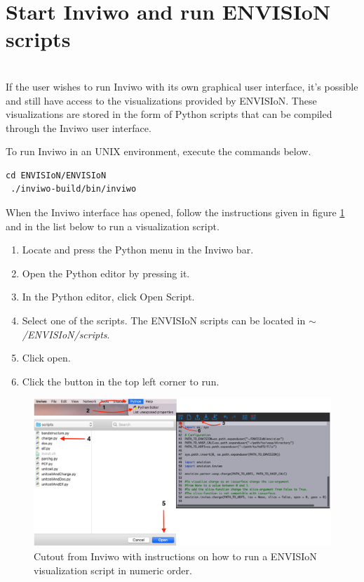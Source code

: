 \section{Start Inviwo and run ENVISIoN scripts}

\\
If the user wishes to run Inviwo with its own graphical user interface, it's possible and still have access to the visualizations provided by ENVISIoN. These visualizations are stored in the form of Python scripts that can be compiled through the Inviwo user interface.

To run Inviwo in an UNIX environment, execute the commands below.

\begin{lstlisting}[frame = single, breaklines=true]
cd ENVISIoN/ENVISIoN
 ./inviwo-build/bin/inviwo
\end{lstlisting}

When the Inviwo interface has opened, follow the instructions given in figure \ref{fig:Inviwo} and in the list below to run a visualization script.

\begin{enumerate}
\item Locate and press the Python menu in the Inviwo bar.
\item Open the Python editor by pressing it.
\item In the Python editor, click Open Script.
\item Select one of the scripts. The ENVISIoN scripts can be located in \emph{$\sim$/ENVISIoN/scripts}.
\item Click open.
\item Click the button in the top left corner to run.
\end{enumerate}

\begin{figure}[ht]
    \centering
    \includegraphics[angle=0, width=\linewidth]{images/completeInviwo.png}
    \caption{Cutout from Inviwo with instructions on how to run a ENVISIoN visualization script in numeric order.}
    \label{fig:Inviwo}
\end{figure}
